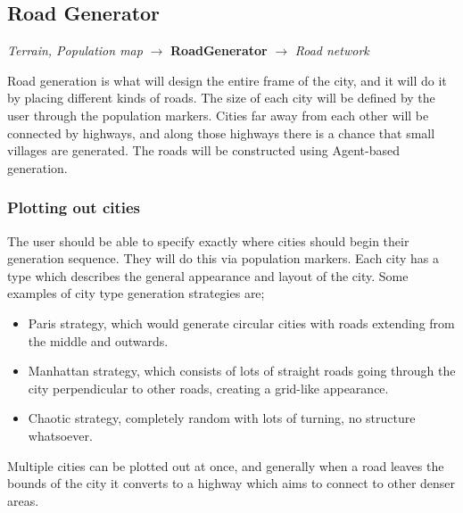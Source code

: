 \subsection{Road Generator}
\begin{center}
  \textit{Terrain, Population map} $\rightarrow$ \textbf{RoadGenerator} $\rightarrow$ \textit{Road network} 
\end{center}
Road generation is what will design the entire frame of the city, and it will do it by placing different kinds of roads.
The size of each city will be defined by the user through the population markers.
Cities far away from each other will be connected by highways, and along those highways there is a chance that small villages are generated.
The roads will be constructed using Agent-based generation.



\subsubsection{Plotting out cities}
The user should be able to specify exactly where cities should begin their generation sequence.
They will do this via population markers.
Each city has a type which describes the general appearance and layout of the city.
Some examples of city type generation strategies are;
\begin{itemize}
  \item Paris strategy, which would generate circular cities with roads extending from the middle and outwards.
  \item Manhattan strategy, which consists of lots of straight roads going through the city perpendicular to other roads, creating a grid-like appearance.
  \item Chaotic strategy, completely random with lots of turning, no structure whatsoever.
\end{itemize}

Multiple cities can be plotted out at once, and generally when a road leaves the bounds of the city it converts to a highway which aims to connect to other denser areas.

